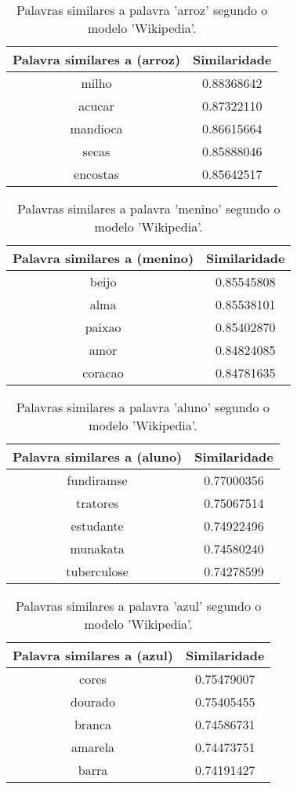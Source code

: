 \begin{table}[H]
\centering
\begin{tabular}{|c | c|}
 \hline
 Palavra similares a (arroz) & Similaridade \\ [0.5ex]
 \hline
 milho & 0.88368642 \\
 \hline
 acucar & 0.87322110 \\
 \hline
 mandioca & 0.86615664 \\
 \hline
 secas & 0.85888046 \\
 \hline
 encostas & 0.85642517 \\
 \hline
\end{tabular}
\caption{Palavras similares a palavra 'arroz' segundo o modelo 'Wikipedia'.}
\label{table:1}
\end{table}

\begin{table}[H]
\centering
\begin{tabular}{|c | c|}
 \hline
 Palavra similares a (menino) & Similaridade \\ [0.5ex]
 \hline
 beijo & 0.85545808 \\
 \hline
 alma & 0.85538101 \\
 \hline
 paixao & 0.85402870 \\
 \hline
 amor & 0.84824085 \\
 \hline
 coracao & 0.84781635 \\
 \hline
\end{tabular}
\caption{Palavras similares a palavra 'menino' segundo o modelo 'Wikipedia'.}
\label{table:1}
\end{table}

\begin{table}[H]
\centering
\begin{tabular}{|c | c|}
 \hline
 Palavra similares a (aluno) & Similaridade \\ [0.5ex]
 \hline
 fundiramse & 0.77000356 \\
 \hline
 tratores & 0.75067514 \\
 \hline
 estudante & 0.74922496 \\
 \hline
 munakata & 0.74580240 \\
 \hline
 tuberculose & 0.74278599 \\
 \hline
\end{tabular}
\caption{Palavras similares a palavra 'aluno' segundo o modelo 'Wikipedia'.}
\label{table:1}
\end{table}

\begin{table}[H]
\centering
\begin{tabular}{|c | c|}
 \hline
 Palavra similares a (azul) & Similaridade \\ [0.5ex]
 \hline
 cores & 0.75479007 \\
 \hline
 dourado & 0.75405455 \\
 \hline
 branca & 0.74586731 \\
 \hline
 amarela & 0.74473751 \\
 \hline
 barra & 0.74191427 \\
 \hline
\end{tabular}
\caption{Palavras similares a palavra 'azul' segundo o modelo 'Wikipedia'.}
\label{table:1}
\end{table}

